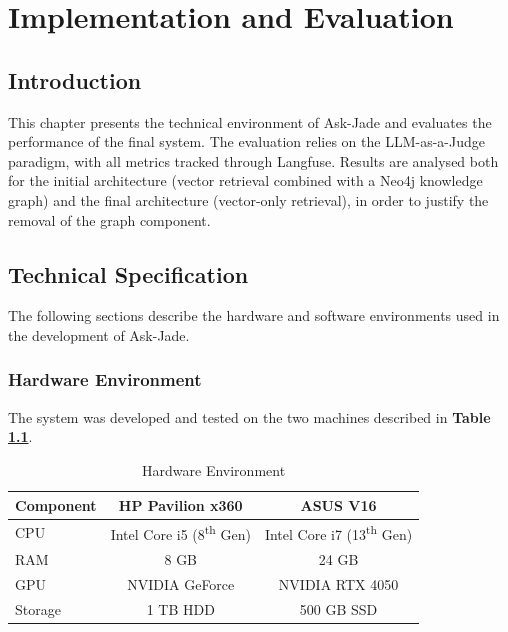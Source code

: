 \chapter{Implementation and Evaluation}

\section{Introduction}

This chapter presents the technical environment of Ask-Jade and evaluates
the performance of the final system. The evaluation relies on the
LLM-as-a-Judge paradigm, with all metrics tracked through Langfuse.
Results are analysed both for the initial architecture (vector retrieval
combined with a Neo4j knowledge graph) and the final architecture
(vector-only retrieval), in order to justify the removal of the graph
component.

\section{Technical Specification}
The following sections describe the hardware and software environments used in the development of Ask-Jade.

\subsection{Hardware Environment}

The system was developed and tested on the two machines described in
\textbf{Table \ref{tab:hardware}}.

\begin{table}[H]
\centering
\caption{Hardware Environment}
\label{tab:hardware}
\begin{tabular}{|l|c|c|}
\hline
\textbf{Component} & \textbf{HP Pavilion x360} & \textbf{ASUS V16} \\
\hline
CPU     & Intel Core i5 (8\textsuperscript{th} Gen)
        & Intel Core i7 (13\textsuperscript{th} Gen) \\
\hline
RAM     & 8 GB   & 24 GB \\
\hline
GPU     & NVIDIA GeForce & NVIDIA RTX 4050 \\
\hline
Storage & 1 TB HDD & 500 GB SSD \\
\hline
\end{tabular}
\end{table}

